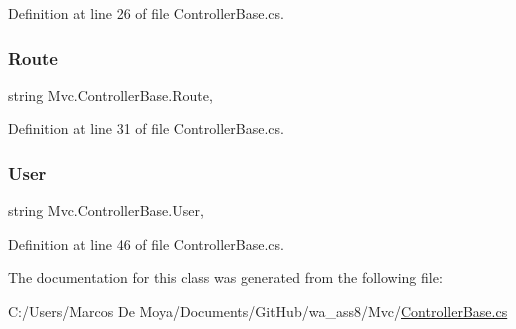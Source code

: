 Definition at line 26 of file Controller\+Base.\+cs.

\mbox{\label{class_mvc_1_1_controller_base_a81657d2312f0c4830fb6ae678654600b}} 
\subsubsection{\texorpdfstring{Route}{Route}}
{\footnotesize\ttfamily string Mvc.\+Controller\+Base.\+Route\hspace{0.3cm}{\ttfamily [get]}, {\ttfamily [set]}}



Definition at line 31 of file Controller\+Base.\+cs.

\mbox{\label{class_mvc_1_1_controller_base_ae7690bfb498ff3be9dc850918a2a2e2b}} 
\subsubsection{\texorpdfstring{User}{User}}
{\footnotesize\ttfamily string Mvc.\+Controller\+Base.\+User\hspace{0.3cm}{\ttfamily [get]}, {\ttfamily [set]}}



Definition at line 46 of file Controller\+Base.\+cs.



The documentation for this class was generated from the following file\+:\begin{DoxyCompactItemize}
\item 
C\+:/\+Users/\+Marcos De Moya/\+Documents/\+Git\+Hub/wa\+\_\+ass8/\+Mvc/\hyperlink{_controller_base_8cs}{Controller\+Base.\+cs}\end{DoxyCompactItemize}
